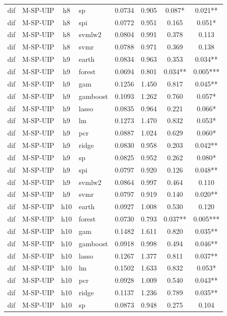 \begin{ThreePartTable}
\begin{longtable}[t]{llclcccc}
dif & M-SP-UIP & h8 & sp & 0.0734 & 0.905 & 0.087* & 0.021**\\
dif & M-SP-UIP & h8 & spi & 0.0772 & 0.951 & 0.165 & 0.051*\\
dif & M-SP-UIP & h8 & svmlw2 & 0.0804 & 0.991 & 0.378 & 0.113\\
dif & M-SP-UIP & h8 & svmr & 0.0788 & 0.971 & 0.369 & 0.138\\
\addlinespace
dif & M-SP-UIP & h9 & earth & 0.0834 & 0.963 & 0.353 & 0.034**\\
dif & M-SP-UIP & h9 & forest & 0.0694 & 0.801 & 0.034** & 0.005***\\
dif & M-SP-UIP & h9 & gam & 0.1256 & 1.450 & 0.817 & 0.045**\\
dif & M-SP-UIP & h9 & gamboost & 0.1093 & 1.262 & 0.760 & 0.057*\\
dif & M-SP-UIP & h9 & lasso & 0.0835 & 0.964 & 0.221 & 0.066*\\
dif & M-SP-UIP & h9 & lm & 0.1273 & 1.470 & 0.832 & 0.053*\\
dif & M-SP-UIP & h9 & pcr & 0.0887 & 1.024 & 0.629 & 0.060*\\
dif & M-SP-UIP & h9 & ridge & 0.0830 & 0.958 & 0.203 & 0.042**\\
dif & M-SP-UIP & h9 & sp & 0.0825 & 0.952 & 0.262 & 0.080*\\
dif & M-SP-UIP & h9 & spi & 0.0797 & 0.920 & 0.126 & 0.048**\\
dif & M-SP-UIP & h9 & svmlw2 & 0.0864 & 0.997 & 0.464 & 0.110\\
dif & M-SP-UIP & h9 & svmr & 0.0797 & 0.919 & 0.140 & 0.020**\\
\addlinespace
dif & M-SP-UIP & h10 & earth & 0.0927 & 1.008 & 0.530 & 0.120\\
dif & M-SP-UIP & h10 & forest & 0.0730 & 0.793 & 0.037** & 0.005***\\
dif & M-SP-UIP & h10 & gam & 0.1482 & 1.611 & 0.820 & 0.035**\\
dif & M-SP-UIP & h10 & gamboost & 0.0918 & 0.998 & 0.494 & 0.046**\\
dif & M-SP-UIP & h10 & lasso & 0.1267 & 1.377 & 0.811 & 0.037**\\
dif & M-SP-UIP & h10 & lm & 0.1502 & 1.633 & 0.832 & 0.053*\\
dif & M-SP-UIP & h10 & pcr & 0.0928 & 1.009 & 0.540 & 0.043**\\
dif & M-SP-UIP & h10 & ridge & 0.1137 & 1.236 & 0.789 & 0.035**\\
dif & M-SP-UIP & h10 & sp & 0.0873 & 0.948 & 0.275 & 0.104\\

\end{longtable}
\end{ThreePartTable}
